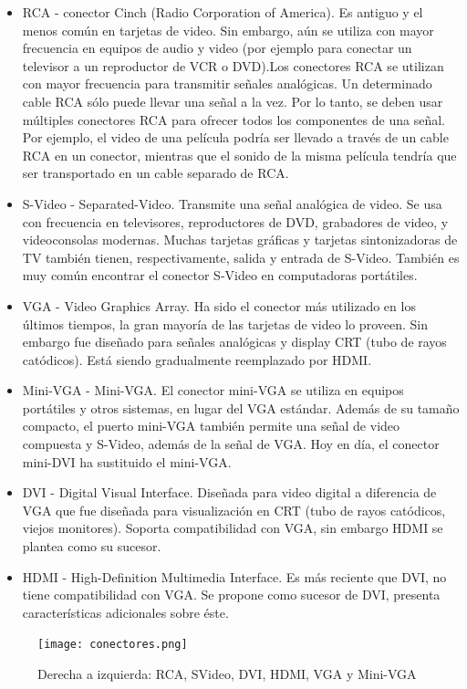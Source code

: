 \documentclass[12pt]{article}
\begin{document}
\begin{itemize}
\item RCA - conector Cinch (Radio Corporation of America). Es antiguo y el menos 
común en tarjetas de video. Sin embargo, aún se utiliza con mayor frecuencia 
en equipos de audio y video (por ejemplo para conectar un televisor a un 
reproductor de VCR o DVD).Los conectores RCA se utilizan con mayor frecuencia 
para transmitir señales analógicas. Un determinado cable RCA sólo puede llevar 
una señal a la vez. Por lo tanto, se deben usar múltiples conectores RCA para 
ofrecer todos los componentes de una señal. Por ejemplo, el video de una 
película podría ser llevado a través de un cable RCA en un conector, 
mientras que el sonido de la misma película tendría que ser transportado en 
un cable separado de RCA. 
\item S-Video - Separated-Video. Transmite una señal analógica de video. 
Se usa con frecuencia en televisores, reproductores de DVD, grabadores de 
video, y videoconsolas modernas. Muchas tarjetas gráficas y tarjetas 
sintonizadoras de TV también tienen, respectivamente, salida y entrada 
de S-Video. También es muy común encontrar el conector S-Video en 
computadoras portátiles.
\item VGA - Video Graphics Array. Ha sido el conector más utilizado en los 
últimos tiempos, la gran mayoría de las tarjetas de video lo proveen. Sin embargo
fue diseñado para señales analógicas y display CRT (tubo de rayos catódicos). 
Está siendo gradualmente reemplazado por HDMI. 
\item Mini-VGA - Mini-VGA. El conector mini-VGA se utiliza en equipos 
portátiles y otros sistemas, en lugar del VGA estándar. Además de su 
tamaño compacto, el puerto mini-VGA también permite una señal de video compuesta 
y S-Video, además de la señal de VGA.  Hoy en día, el conector mini-DVI ha 
sustituido el mini-VGA.
\item DVI - Digital Visual Interface. Diseñada para video digital a 
diferencia de VGA que fue diseñada para visualización en CRT (tubo de 
rayos catódicos, viejos monitores). Soporta compatibilidad con VGA, sin 
embargo HDMI se plantea como su sucesor.  
\item HDMI - High-Definition Multimedia Interface. Es más reciente que 
DVI, no tiene compatibilidad con VGA. Se propone como sucesor de 
DVI, presenta características adicionales sobre éste. 
\end{itemize}

\begin{figure}[h]
\centering
\texttt{[image: conectores.png]}
\renewcommand{\figurename}{Fig.}
\caption{Derecha a izquierda: RCA, SVideo, DVI, HDMI, VGA y Mini-VGA}
\label{contexto:figura}
\end{figure}
\end{document}

